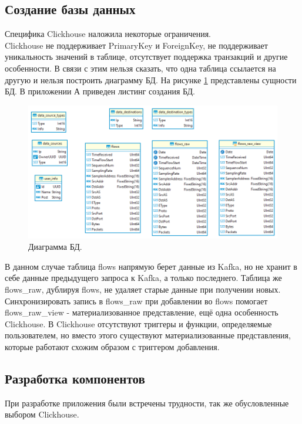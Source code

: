 \subsection{Создание базы данных}
Специфика Clickhouse наложила некоторые ограничения. \\
Clickhouse не поддерживает PrimaryKey и ForeignKey, не поддерживает уникальность значений в таблице, отсутствует поддержка транзакций и другие особенности\cite{clickhouse}. В связи с этим нельзя сказать, что одна таблица ссылается на другую и нельзя построить диаграмму БД. На рисунке \ref{img:DB} представлены сущности БД. В приложении А приведен листинг создания БД. \\
\begin{figure}[H]
	\centering
	\includegraphics[scale=0.55]{images/bd.png}
	\caption{Диаграмма БД.}
	\label{img:DB}
\end{figure}
В данном случае таблица flows напрямую берет данные из Kafka, но не хранит в себе данные предыдущего запроса к Kafka, а только последнего. Таблица же flows\_raw, дублируя flows, не удаляет старые данные при получении новых. Синхронизировать запись в flows\_raw при добавлении во flows помогает flows\_raw\_view - материализованное представление, ещё одна особенность Clickhouse. В Clickhouse отсутствуют триггеры и функции, определяемые пользователем, но вместо этого существуют материализованные представления, которые работают схожим образом с триггером добавления.
\subsection{Разработка компонентов}
При разработке приложения были встречены трудности, так же обусловленные выбором Clickhouse.

